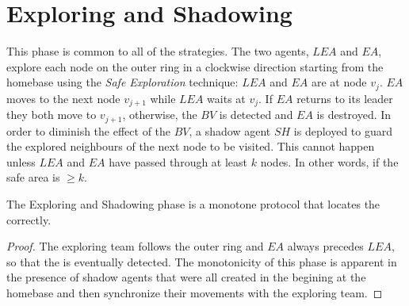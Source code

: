 \section{Exploring and Shadowing}

This phase is common to all of the strategies.
The two agents,  $LEA$ and $EA$,   explore each node on the outer ring in a clockwise direction starting from the homebase  using the {\em Safe Exploration} technique:  $LEA$ and $EA$ are at node $v_{j}$. $EA$ moves to the next node $v_{j+1}$ while $LEA$ waits at $v_{j}$. If $EA$ returns to its leader they both move to $v_{j+1}$, otherwise, the $BV$ is detected and $EA$ is destroyed. 
In order to diminish the effect of the $BV$, a shadow agent $SH$ is deployed to guard the explored neighbours of the next node to be visited. This cannot happen unless $LEA$ and $EA$ have passed through at least $k$ nodes. In other words, if the safe area is $\ge k$.
 \begin{lemma}\label{monotone_ph1}
The Exploring and Shadowing phase is a monotone protocol that locates the \bv correctly.
\end{lemma}
\begin{proof}
The  exploring team follows the outer ring and $EA$ always precedes $LEA$, so that the \bv is eventually detected. The monotonicity of this phase is apparent in the presence of shadow agents that were all created in the begining at the homebase and then synchronize their movements with the exploring team. 
\end{proof}
 \begin{center}
\end{center}

